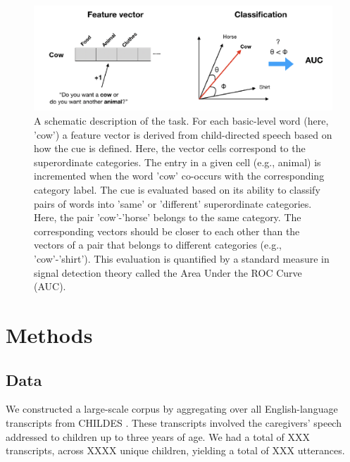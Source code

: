 \documentclass[10pt, letterpaper]{article}
\newenvironment{CodeChunk}{}{}
\begin{document}
\begin{CodeChunk}
\begin{figure}[t!]

{\centering \includegraphics{cogsci_files/figure-latex/task-1}

}

\caption{\label{fig:task} A schematic description of the task. For each basic-level word (here, 'cow') a feature vector is derived from child-directed speech based on how the cue is defined. Here, the vector cells correspond to the superordinate categories. The entry in a given cell (e.g., animal) is incremented when the word 'cow' co-occurs with the corresponding category label. The cue is evaluated based on its ability to classify pairs of words into 'same' or 'different' superordinate categories. Here, the pair 'cow'-'horse' belongs to the same category. The corresponding vectors should be closer to each other than the vectors of a pair that belongs to different categories (e.g., 'cow'-'shirt'). This evaluation is quantified by a standard measure in signal detection theory called the Area Under the ROC Curve (AUC).}\label{fig:task}
\end{figure}
\end{CodeChunk}

\hypertarget{analyses}{%
\section{Methods}\label{analyses}}

\hypertarget{data}{%
\subsection{Data}\label{data}}

We constructed a large-scale corpus by aggregating over all
English-language transcripts from CHILDES \cite{macwhinney2014,sanchez2019}. These transcripts involved the caregivers' speech addressed
to children up to three years of age. We had a total of XXX transcripts,
across XXXX unique children, yielding a total of XXX utterances.
\end{document}
